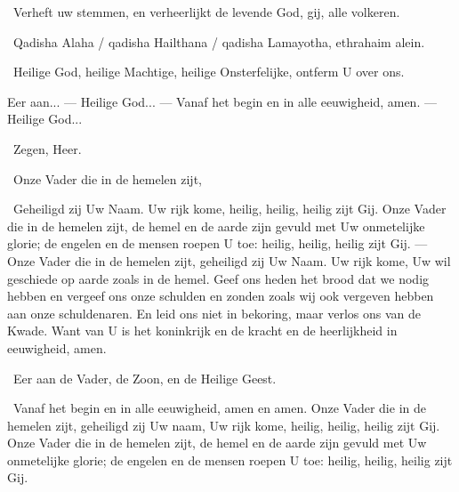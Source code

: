 \documentclass[12pt,twoside,a5paper]{article}
\begin{document}

\dd~Verheft uw stemmen, en verheerlijkt de levende God, gij, alle volkeren.

\begin{doublecols}
  \fontsize{11}{12}\selectfont

  \dutchl \rr~Qadisha Alaha / qadisha Hailthana / qadisha Lamayotha, ethrahaim alein.

   \rr~Heilige God, heilige Machtige, heilige Onsterfelijke, ontferm U over ons.
\end{doublecols}

\begin{halfparskip}
  Eer aan... --- Heilige God... --- Vanaf het begin en in alle eeuwigheid, amen. --- Heilige God...

  \dd~Zegen, Heer.

  \cc~Onze Vader die in de hemelen zijt,

  \rr~Geheiligd zij Uw Naam. Uw rijk kome, heilig, heilig, heilig zijt Gij. Onze Vader die in de hemelen zijt, de hemel en de aarde zijn gevuld met Uw onmetelijke glorie; de engelen en de mensen roepen U toe: heilig, heilig, heilig zijt Gij. --- Onze Vader die in de hemelen zijt, geheiligd zij Uw Naam. Uw rijk kome, Uw wil geschiede op aarde zoals in de hemel. Geef ons heden het brood dat we nodig hebben en vergeef ons onze schulden en zonden zoals wij ook vergeven hebben aan onze schuldenaren. En leid ons niet in bekoring, maar verlos ons van de Kwade. Want van U is het koninkrijk en de kracht en de heerlijkheid in eeuwigheid, amen.

  \cc~Eer aan de Vader, de Zoon, en de Heilige Geest.

  \rr~Vanaf het begin en in alle eeuwigheid, amen en amen. Onze Vader die in de hemelen zijt, geheiligd zij Uw naam, Uw rijk kome, heilig, heilig, heilig zijt Gij. Onze Vader die in de hemelen zijt, de hemel en de aarde zijn gevuld met Uw onmetelijke glorie; de engelen en de mensen roepen U toe: heilig, heilig, heilig zijt Gij.

\end{halfparskip}
\end{document}
